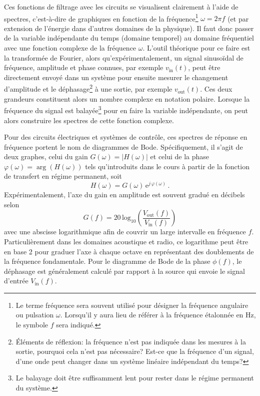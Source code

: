 \documentclass[canadien,12pt,oneside,letterpaper]{article}
\begin{document}
Ces fonctions de filtrage avec les circuits se visualisent clairement à l'aide de spectres, c'est-à-dire de graphiques en fonction de la fréquence\footnote{Le terme fréquence sera souvent utilisé pour désigner la fréquence angulaire ou pulsation $\omega$. Lorsqu'il y aura lieu de référer à la fréquence étalonnée en \si{\hertz}, le symbole $f$ sera indiqué.} $\omega=2\pi f$ (et par extension de l'énergie dans d'autres domaines de la physique). Il faut donc passer de la variable indépendante du temps (domaine temporel) au domaine fréquentiel avec une fonction complexe de la fréquence $\omega$. L'outil théorique pour ce faire est la transformée de Fourier, alors qu'expérimentalement, un signal sinusoïdal de fréquence, amplitude et phase connues, par exemple $v_{\mathrm{in}}(t)$, peut être directement envoyé dans un système pour ensuite mesurer le changement d'amplitude et le déphasage\footnote{Éléments de réflexion: la fréquence n'est pas indiquée dans les mesures à la sortie, pourquoi cela n'est pas nécessaire? Est-ce que la fréquence d'un signal, d'une onde peut changer dans un système linéaire indépendant du temps?} à une sortie, par exemple $v_{\mathrm{out}}(t)$. Ces deux grandeurs constituent alors un nombre complexe en notation polaire. Lorsque la fréquence du signal est balayée\footnote{Le balayage doit être suffisamment lent pour rester dans le régime permanent du système.} pour en faire la variable indépendante, on peut alors construire les spectres de cette fonction complexe.

Pour des circuits électriques et systèmes de contrôle, ces spectres de réponse en fréquence portent le nom de diagrammes de Bode. Spécifiquement, il s'agit de deux graphes, celui du gain $G(\omega)=\left|H\!\left(\omega\right)\right|$ et celui de la phase $\varphi(\omega)=\arg\left( H\!\left(\omega\right)\right)$ tels qu'introduits dans le cours à partir de la fonction de transfert en régime permanent, soit 
\begin{equation} \label{eq:GainPhase}
H\!\left(\omega\right)=G\!\left(\omega\right)\,\mathrm{e}^{j\,\varphi(\omega)}\, .
\end{equation}
Expérimentalement, l'axe du gain en amplitude est souvent gradué en décibels selon \[G\!\left(f\right)=20\,\textrm{log}_{10}\left(\frac{V_{\mathrm{out}}(f)}{V_{\mathrm{in}}(f)}\right)\]
avec une abscisse logarithmique afin de couvrir un large intervalle en fréquence $f$. Particulièrement dans les domaines acoustique et radio, ce logarithme peut être en base 2 pour graduer l'axe à chaque octave en représentant des doublements de la fréquence fondamentale. Pour le diagramme de Bode de la phase $\phi\!\left(f\right)$, le déphasage est généralement calculé par rapport à la source qui envoie le signal d'entrée $V_{\mathrm{in}}(f)$.
\end{document}
